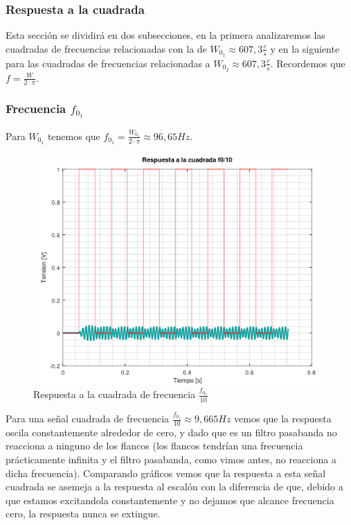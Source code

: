 \documentclass[11pt,a4paper]{report}
\begin{document}
\newpage
\subsubsection*{Respuesta a la cuadrada}

Esta sección se dividirá en dos subsecciones, en la primera analizaremos las cuadradas de frecuencias relacionadas con la de $W_{0_{1}} \approx 607,3 \frac{r}{s}$ y en la siguiente para las cuadradas de frecuencias relacionadas a $W_{0_{2}} \approx 607,3 \frac{r}{s}$. Recordemos que $f = \frac{W}{2 \cdot \pi}$.

\subsubsection*{Frecuencia $f_{0_{1}}$}

Para $W_{0_{1}}$ tenemos que $f_{0_{1}} = \frac{W_{0_{1}}}{2 \cdot \pi} \approx 96,65Hz$.

\begin{figure}[h!]
\includegraphics[scale=1]{RtaCuadradaWo11.png}
\caption{Respuesta a la cuadrada de frecuencia $\frac{f_{0_{1}}}{10}$}
\end{figure}

Para una señal cuadrada de frecuencia $\frac{f_{0_{1}}}{10} \approx 9,665Hz$ vemos que 
la respuesta oscila constantemente alrededor de cero, y dado que es un filtro pasabanda no reacciona a ninguno de los flancos (los flancos tendrían una frecuencia
prácticamente infinita y el filtro pasabanda, como vimos antes, no reacciona a dicha frecuencia). Comparando gráficos vemos que la respuesta a esta señal cuadrada se asemeja a la respuesta al escalón con la diferencia de que, debido a que estamos excitandola constantemente y no dejamos que alcance frecuencia cero, la respuesta nunca se extingue.
\end{document}
